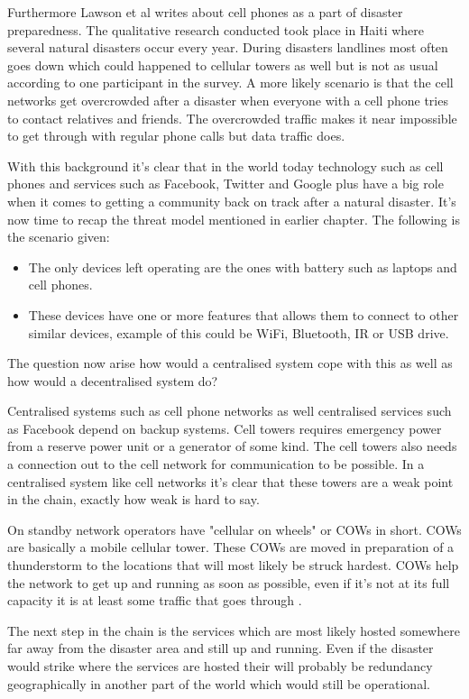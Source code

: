 Furthermore Lawson et al \cite{lawson2012} writes about cell phones as a part of disaster preparedness.
The qualitative research conducted took place in Haiti where several natural disasters occur every year.
During disasters landlines most often goes down which could happened to cellular towers as well but is not as usual according to one participant in the survey.
A more likely scenario is that the cell networks get overcrowded after a disaster when everyone with a cell phone tries to contact relatives and friends.
The overcrowded traffic makes it near impossible to get through with regular phone calls but data traffic does.

With this background it's clear that in the world today technology such as cell phones and services such as Facebook, Twitter and Google plus have a big role when it comes to getting a community back on track after a natural disaster.
It's now time to recap the threat model mentioned in earlier chapter.
The following is the scenario given:
\begin{itemize}
  \item The only devices left operating are the ones with battery such as laptops and cell phones.
  \item These devices have one or more features that allows them to connect to other similar devices, example of this could be WiFi, Bluetooth, IR or USB drive.
\end{itemize}
The question now arise how would a centralised system cope with this as well as how would a decentralised system do?

Centralised systems such as cell phone networks as well centralised services such as Facebook depend on backup systems.
Cell towers requires emergency power from a reserve power unit or a generator of some kind.
The cell towers also needs a connection out to the cell network for communication to be possible.
In a centralised system like cell networks it's clear that these towers are a weak point in the chain, exactly how weak is hard to say.

On standby network operators have "cellular on wheels" or COWs in short.
COWs are basically a mobile cellular tower.
These COWs are moved in preparation of a thunderstorm to the locations that will most likely be struck hardest.
COWs help the network to get up and running as soon as possible, even if it's not at its full capacity it is at least some traffic that goes through \cite{swartz1999}.

The next step in the chain is the services which are most likely hosted somewhere far away from the disaster area and still up and running.
Even if the disaster would strike where the services are hosted their will probably be redundancy geographically in another part of the world which would still be operational.

